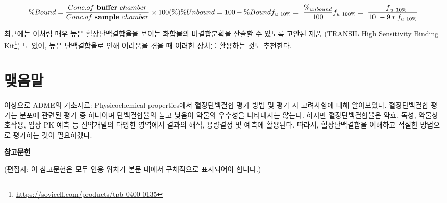 \documentclass[
  11pt,
  krantz2, a4paper, twoside]{krantz}
\begin{document}
\begin{equation}
\% Bound = \frac{Conc.of\ \mathbf{buffer}\ chamber}{Conc.of\ \mathbf{sample}\ chamber} \times 100(\%) \\
\% Unbound = 100 - \% Bound \\
f_{u\ 10\%} = \ \frac{\%_{unbound}}{100} \\ 
f_{u\ 100\%} = \ \frac{{\ \ \ f}_{u\ 10\%}}{10\  - 9*f_{u\ 10\%}}
\label{eq:eq03-03} 
\end{equation}

최근에는 이처럼 매우 높은 혈장단백결합율을 보이는 화합물의 비결합분획을 산출할 수 있도록 고안된 제품 (TRANSIL High Sensitivity Binding Kit\footnote{\url{https://sovicell.com/products/tpb-0400-0135}}) 도 있어, 높은 단백결합율로 인해 어려움을 겪을 때 이러한 장치를 활용하는 것도 추천한다.

\hypertarget{uxb9fauxc74cuxb9d0-2}{%
\section{맺음말}\label{uxb9fauxc74cuxb9d0-2}}

이상으로 ADME의 기초자료: Physicochemical properties에서 혈장단백결합 평가 방법 및 평가 시 고려사항에 대해 알아보았다. 혈장단백결합 평가는 분포에 관련된 평가 중 하나이며 단백결합율의 높고 낮음이 약물의 우수성을 나타내지는 않는다. 하지만 혈장단백결합율은 약효, 독성, 약물상호작용, 임상 PK 예측 등 신약개발의 다양한 영역에서 결과의 해석, 용량결정 및 예측에 활용된다. 따라서, 혈장단백결합을 이해하고 적절한 방법으로 평가하는 것이 필요하겠다.

\textbf{참고문헌}

(편집자: 이 참고문헌은 모두 인용 위치가 본문 내에서 구체적으로 표시되어야 합니다.)
\end{document}
